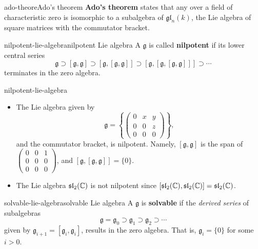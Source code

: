 \begin{topic}{ado-theore}{Ado's theorem}
    \textbf{Ado's theorem} states that any  over a field of characteristic zero is isomorphic to a subalgebra of $\mathfrak{gl}_n(k)$, the Lie algebra of square matrices with the commutator bracket.
\end{topic}

\begin{topic}{nilpotent-lie-algebra}{nilpotent Lie algebra}
    A  $\mathfrak{g}$ is called \textbf{nilpotent} if its lower central series
    \[ \mathfrak{g} \supset [\mathfrak{g}, \mathfrak{g}] \supset [\mathfrak{g}, [\mathfrak{g}, \mathfrak{g}]] \supset [\mathfrak{g}, [\mathfrak{g}, [\mathfrak{g}, \mathfrak{g}]]] \supset \cdots \]
    terminates in the zero algebra.
\end{topic}

\begin{example}{nilpotent-lie-algebra}
    \begin{itemize}
        \item The Lie algebra given by
        \[ \mathfrak{g} = \left\{ \begin{pmatrix} 0 & x & y \\ 0 & 0 & z \\ 0 & 0 & 0 \end{pmatrix} \right\} , \]
        and the commutator bracket, is nilpotent. Namely, $[\mathfrak{g}, \mathfrak{g}]$ is the span of $\begin{pmatrix} 0 & 0 & 1 \\ 0 & 0 & 0 \\ 0 & 0 & 0 \end{pmatrix}$, and $[\mathfrak{g}, [\mathfrak{g}, \mathfrak{g}]] = \{ 0 \}$.
        
        \item The Lie algebra $\mathfrak{sl}_2(\mathbb{C})$ is not nilpotent since $[\mathfrak{sl}_2(\mathbb{C}), \mathfrak{sl}_2(\mathbb{C})] = \mathfrak{sl}_2(\mathbb{C})$.
    \end{itemize}
\end{example}

\begin{topic}{solvable-lie-algebra}{solvable Lie algebra}
    A  $\mathfrak{g}$ is \textbf{solvable} if the \textit{derived series} of subalgebras
    \[ \mathfrak{g} = \mathfrak{g}_0 \supset \mathfrak{g}_1 \supset \mathfrak{g}_2 \supset \cdots \]
    given by $\mathfrak{g}_{i + 1} = [\mathfrak{g}_i, \mathfrak{g}_i]$, results in the zero algebra. That is, $\mathfrak{g}_i = \{ 0 \}$ for some $i > 0$.
\end{topic}

